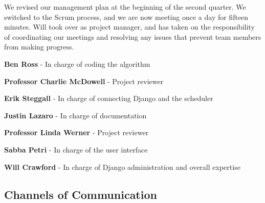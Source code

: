 \documentclass[12pt]{article}
\begin{document}
We revised our management plan at the beginning of the second quarter. We switched to the Scrum process, and we are now meeting once a day for fifteen minutes. Will took over as project manager, and has taken on the responsibility of coordinating our meetings and resolving any issues that prevent team members from making progress. 
	
\begin{description}
\item{\textbf{Ben Ross}} - In charge of coding the algorithm
\item{\textbf{Professor Charlie McDowell}} - Project reviewer
\item{\textbf{Erik Steggall}} - In charge of connecting Django and the scheduler
\item{\textbf{Justin Lazaro}} - In charge of documentation
\item{\textbf{Professor Linda Werner}} - Project reviewer
\item{\textbf{Sabba Petri}} - In charge of the user interface
\item{\textbf{Will Crawford}} - In charge of Django administration and overall expertise
\end{description}

\subsection{Channels of Communication}
\end{document}
